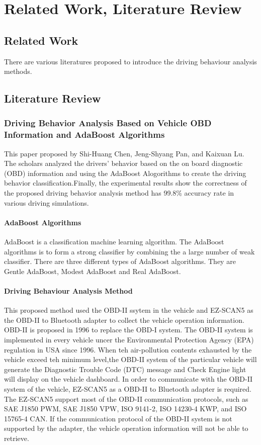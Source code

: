 \chapter{Related Work, Literature Review}
\section{Related Work}
There are various literatures proposed to introduce the driving behaviour analysis methods.
\subsection{}

\section{Literature Review}
\subsection{Driving Behavior Analysis Based on Vehicle OBD Information and AdaBoost Algorithms}
This paper proposed by Shi-Huang Chen, Jeng-Shyang Pan, and Kaixuan Lu. The scholars analyzed the drivers' behavior based on the on board diagnostic (OBD) information and using the AdaBoost Alogorithms to create the driving  behavior classification.Finally, the experimental results show the correctness of the proposed driving behavior analysis method has 99.8\% accuracy rate in various driving simulations.

\subsubsection{AdaBoost Algorithms}
AdaBoost is a classification machine learning algorithm. The AdaBoost algorithms is to form a strong classifier by combining the a large number of weak classifier. There are three different types of AdaBoost algorithms. They are Gentle AdaBoost, Modest AdaBoost and Real AdaBoost.

\subsubsection{Driving Behaviour Analysis Method}
This proposed method used the OBD-II ssytem in the vehicle and EZ-SCAN5 as the OBD-II to Bluetooth adapter to collect the vehicle operation information. OBD-II is proposed in 1996 to replace the OBD-I system. The OBD-II system is implemented in every vehicle uncer the Environmental Protection Agency (EPA) regulation in USA since 1996. When teh air-pollution contents exhausted by the vehicle exceed teh minimum level,the OBD-II system of the particular vehicle will generate the Diagnostic Trouble Code (DTC) message and Check Engine light will display on the vehicle dashboard. In order to communicate with the OBD-II system of the vehicle, EZ-SCAN5 as a OBD-II to Bluetooth adapter is required. The EZ-SCAN5 support most of the OBD-II communication protocols, such as SAE J1850 PWM, SAE J1850 VPW, ISO 9141-2, ISO 14230-4 KWP, and ISO 15765-4 CAN. If the communication protocol of the OBD-II system is not supported by the adapter, the vehicle operation information will not be able to retrieve.


